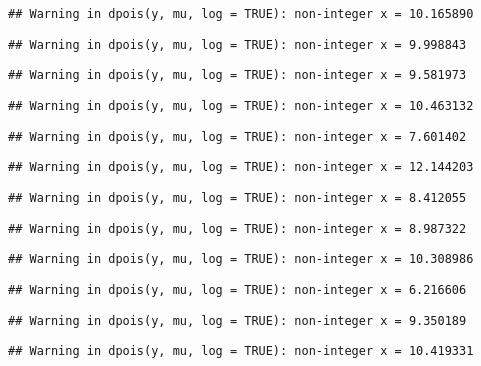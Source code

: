 \documentclass[
]{article}
\begin{document}
\begin{verbatim}
## Warning in dpois(y, mu, log = TRUE): non-integer x = 10.165890
\end{verbatim}

\begin{verbatim}
## Warning in dpois(y, mu, log = TRUE): non-integer x = 9.998843
\end{verbatim}

\begin{verbatim}
## Warning in dpois(y, mu, log = TRUE): non-integer x = 9.581973
\end{verbatim}

\begin{verbatim}
## Warning in dpois(y, mu, log = TRUE): non-integer x = 10.463132
\end{verbatim}

\begin{verbatim}
## Warning in dpois(y, mu, log = TRUE): non-integer x = 7.601402
\end{verbatim}

\begin{verbatim}
## Warning in dpois(y, mu, log = TRUE): non-integer x = 12.144203
\end{verbatim}

\begin{verbatim}
## Warning in dpois(y, mu, log = TRUE): non-integer x = 8.412055
\end{verbatim}

\begin{verbatim}
## Warning in dpois(y, mu, log = TRUE): non-integer x = 8.987322
\end{verbatim}

\begin{verbatim}
## Warning in dpois(y, mu, log = TRUE): non-integer x = 10.308986
\end{verbatim}

\begin{verbatim}
## Warning in dpois(y, mu, log = TRUE): non-integer x = 6.216606
\end{verbatim}

\begin{verbatim}
## Warning in dpois(y, mu, log = TRUE): non-integer x = 9.350189
\end{verbatim}

\begin{verbatim}
## Warning in dpois(y, mu, log = TRUE): non-integer x = 10.419331
\end{verbatim}
\end{document}
